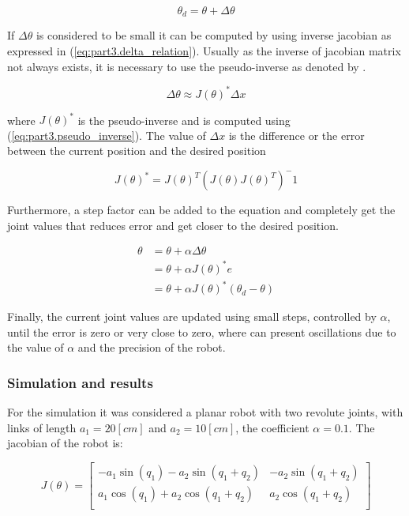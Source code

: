 \begin{equation}
\theta_d=\theta+\Delta\theta
\end{equation}

If $\Delta\theta$ is considered to be small it can be computed by using inverse jacobian as expressed in (\ref{eq:part3.delta_relation}). Usually as the inverse of jacobian matrix not always exists, it is necessary to use the pseudo-inverse as denoted by \citep{penrose1955generalized}.

\begin{equation}
\label{eq:part3.delta_relation}
\Delta\theta \approx  J(\theta)^{*}\Delta x
\end{equation}

where $J(\theta)^{*}$ is the pseudo-inverse and is computed using (\ref{eq:part3.pseudo_inverse}). The value of $\Delta x$ is the difference or the error between the current position and the desired position 

\begin{equation}
\label{eq:part3.pseudo_inverse}
J(\theta)^{*} = J(\theta)^T(J(\theta)J(\theta)^T)^-1
\end{equation}

Furthermore, a step factor can be added to the equation and completely get the joint values that reduces error and get closer to the desired position.

\begin{equation}
\begin{aligned}
\theta & = \theta + \alpha\Delta\theta \\
& = \theta + \alpha J(\theta)^{*}e \\
&=  \theta + \alpha J(\theta)^{*}(\theta_d - \theta)
\end{aligned}
\end{equation}

Finally, the current joint values are updated using small steps, controlled by $\alpha$, until the error is zero or very close to zero, where can present oscillations  due to the value of $\alpha$ and the precision of the robot.

\subsubsection{Simulation and results}
For the simulation it was considered a planar robot with two revolute joints, with links of length $a_1=20 [cm]$ and $a_2=10 [cm]$, the coefficient $\alpha = 0.1$. The jacobian of the robot is:

\begin{equation}
J(\theta) = \left[ \begin{array}{cc}
	-a_1\sin(q_1) - a_2\sin(q_1+q_2) & -a_2\sin(q_1+q_2) \\
        a_1\cos(q_1)+a_2\cos(q_1+q_2) & a_2\cos(q_1+q_2) \\
\end{array} \right] 
\end{equation}


